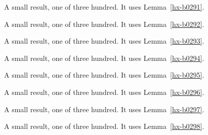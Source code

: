 \begin{lemma}[Bulk 292]\label{hx-b0292}
A small result, one of three hundred. It uses Lemma~\ref{hx-b0291}.
\end{lemma}

\begin{lemma}[Bulk 293]\label{hx-b0293}
A small result, one of three hundred. It uses Lemma~\ref{hx-b0292}.
\end{lemma}

\begin{lemma}[Bulk 294]\label{hx-b0294}
A small result, one of three hundred. It uses Lemma~\ref{hx-b0293}.
\end{lemma}

\begin{lemma}[Bulk 295]\label{hx-b0295}
A small result, one of three hundred. It uses Lemma~\ref{hx-b0294}.
\end{lemma}

\begin{lemma}[Bulk 296]\label{hx-b0296}
A small result, one of three hundred. It uses Lemma~\ref{hx-b0295}.
\end{lemma}

\begin{lemma}[Bulk 297]\label{hx-b0297}
A small result, one of three hundred. It uses Lemma~\ref{hx-b0296}.
\end{lemma}

\begin{lemma}[Bulk 298]\label{hx-b0298}
A small result, one of three hundred. It uses Lemma~\ref{hx-b0297}.
\end{lemma}

\begin{lemma}[Bulk 299]\label{hx-b0299}
A small result, one of three hundred. It uses Lemma~\ref{hx-b0298}.
\end{lemma}
